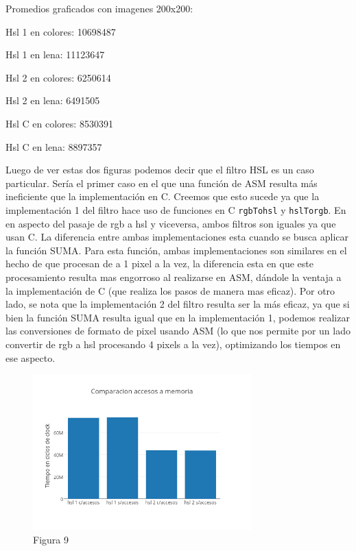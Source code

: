 \documentclass[a4paper]{article}
\begin{document}
Promedios graficados con imagenes 200x200:

Hsl 1 en colores: 10698487

Hsl 1 en lena: 11123647

Hsl 2 en colores: 6250614

Hsl 2 en lena: 6491505

Hsl C en colores: 8530391

Hsl C en lena: 8897357

Luego de ver estas dos figuras podemos decir que el filtro HSL es un caso particular. Sería el primer caso en el que una función de ASM resulta más ineficiente que la implementación en C. Creemos que esto sucede ya que la implementación 1 del filtro hace uso de funciones en C {\tt rgbTohsl} y {\tt hslTorgb}. En en aspecto del pasaje de rgb a hsl y viceversa, ambos filtros son iguales ya que usan C. La diferencia entre ambas implementaciones esta cuando se busca aplicar la función SUMA. Para esta función, ambas implementaciones son similares en el hecho de que procesan de a 1 pixel a la vez, la diferencia esta en que este procesamiento resulta mas engorroso al realizarse en ASM, dándole la ventaja a la implementación de C (que realiza los pasos de manera mas eficaz).
Por otro lado, se nota que la implementación 2 del filtro resulta ser la más eficaz, ya que si bien la función SUMA resulta igual que en la implementación 1, podemos realizar las conversiones de formato de pixel usando ASM (lo que nos permite por un lado convertir de rgb a hsl procesando 4 pixels a la vez), optimizando los tiempos en ese aspecto.
 

\begin{figure}[h]
  \centering
    \includegraphics[width=0.75\textwidth]{imagenes/ComparacionAccesosAMemoriaHslColores.png}
  \caption{Figura 9}
  \label{fig:graficohsl3}
\end{figure}
 \FloatBarrier
\end{document}
